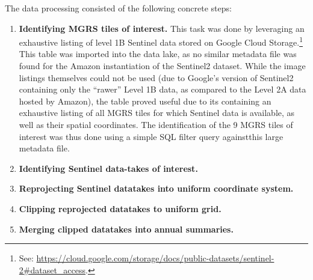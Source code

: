 The data processing consisted of the following concrete steps:

\begin{enumerate}
   \item \textbf{Identifying MGRS tiles of interest.} This task was done by leveraging an exhaustive listing of level 1B Sentinel data stored on Google Cloud Storage.\footnote{See: \url{https://cloud.google.com/storage/docs/public-datasets/sentinel-2#dataset_access}.} This table was imported into the data lake, as no similar metadata file was found for the Amazon instantiation of the Sentinel2 dataset. While the image listings themselves could not be used (due to Google's version of Sentinel2 containing only the ``rawer'' Level 1B data, as compared to the Level 2A data hosted by Amazon), the table proved useful due to its containing an exhaustive listing of all MGRS tiles for which Sentinel data is available, as well as their spatial coordinates. The identification of the 9 MGRS tiles of interest was thus done using a simple SQL filter query againstthis large metadata file. 
   \item \textbf{Identifying Sentinel data-takes of interest.}
   \item \textbf{Reprojecting Sentinel datatakes into uniform coordinate system.}
   \item \textbf{Clipping reprojected datatakes to uniform grid.}
   \item \textbf{Merging clipped datatakes into annual summaries.}
\end{enumerate}
